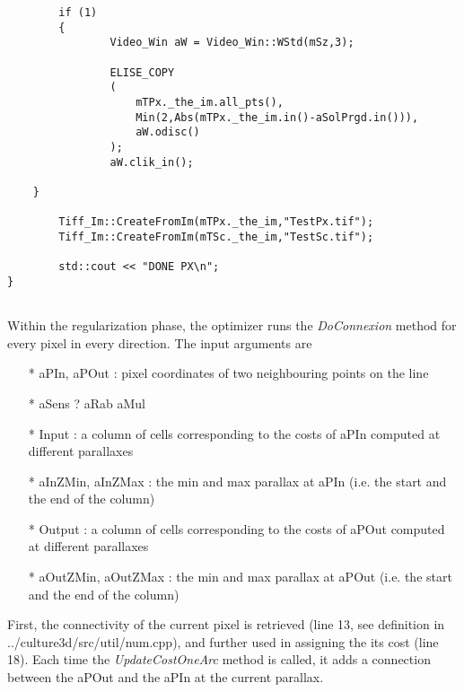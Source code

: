 \begin{lstlisting}
        if (1)
        {
                Video_Win aW = Video_Win::WStd(mSz,3);

                ELISE_COPY
                (
                    mTPx._the_im.all_pts(),
                    Min(2,Abs(mTPx._the_im.in()-aSolPrgd.in())),
                    aW.odisc()
                );
                aW.clik_in();

    }

        Tiff_Im::CreateFromIm(mTPx._the_im,"TestPx.tif");
        Tiff_Im::CreateFromIm(mTSc._the_im,"TestSc.tif");

        std::cout << "DONE PX\n";
}


\end{lstlisting}

\noindent Within the regularization phase, the optimizer runs the \emph{DoConnexion} method for every pixel in every direction. The input arguments are
\begin{itemize}
   \item[*] aPIn, aPOut : pixel coordinates of two neighbouring points on the line 
   \item[*] aSens ? aRab aMul
   \item[*] Input : a column of cells corresponding to the costs of aPIn computed at different parallaxes    
   \item[*] aInZMin, aInZMax : the min and max parallax at aPIn (i.e. the start and the end of the column) 
   \item[*] Output : a column of cells corresponding to the costs of aPOut computed at different parallaxes
   \item[*] aOutZMin, aOutZMax : the min and max parallax at aPOut (i.e. the start and the end of the column) 
\end{itemize}
First, the connectivity of the current pixel is retrieved (line 13, see definition in ../culture3d/src/util/num.cpp), and further used in assigning the its cost (line 18). Each time the \emph{UpdateCostOneArc} method is called, it adds a connection between the aPOut and the aPIn at the current parallax.  




